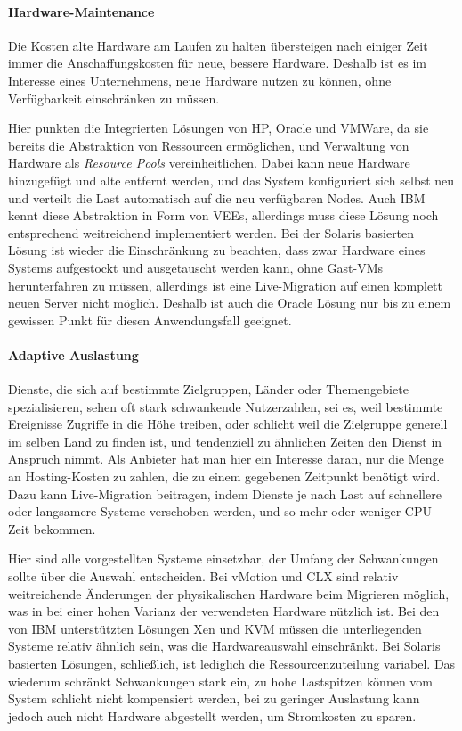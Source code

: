 \paragraph*{Hardware-Maintenance}
Die Kosten alte Hardware am Laufen zu halten übersteigen nach einiger
Zeit immer die Anschaffungskosten für neue, bessere Hardware. Deshalb
ist es im Interesse eines Unternehmens, neue Hardware nutzen zu
können, ohne Verfügbarkeit einschränken zu müssen.

Hier punkten die Integrierten Lösungen von HP, Oracle und VMWare, da
sie bereits die Abstraktion von Ressourcen ermöglichen, und Verwaltung
von Hardware als \emph{Resource Pools} vereinheitlichen. Dabei kann
neue Hardware hinzugefügt und alte entfernt werden, und das System
konfiguriert sich selbst neu und verteilt die Last automatisch auf die
neu verfügbaren Nodes. Auch IBM kennt diese Abstraktion in Form von
\acp{VEE}, allerdings muss diese Lösung noch entsprechend weitreichend
implementiert werden.  Bei der Solaris basierten Lösung ist wieder die
Einschränkung zu beachten, dass zwar Hardware eines Systems
aufgestockt und ausgetauscht werden kann, ohne Gast-VMs herunterfahren
zu müssen, allerdings ist eine Live-Migration auf einen komplett neuen
Server nicht möglich. Deshalb ist auch die Oracle Lösung nur bis zu
einem gewissen Punkt für diesen Anwendungsfall geeignet.

\paragraph*{Adaptive Auslastung}
Dienste, die sich auf bestimmte Zielgruppen, Länder oder Themengebiete
spezialisieren, sehen oft stark schwankende Nutzerzahlen, sei es, weil
bestimmte Ereignisse Zugriffe in die Höhe treiben, oder schlicht weil
die Zielgruppe generell im selben Land zu finden ist, und tendenziell
zu ähnlichen Zeiten den Dienst in Anspruch nimmt. Als Anbieter hat man
hier ein Interesse daran, nur die Menge an Hosting-Kosten zu zahlen,
die zu einem gegebenen Zeitpunkt benötigt wird. Dazu kann
Live-Migration beitragen, indem Dienste je nach Last auf schnellere
oder langsamere Systeme verschoben werden, und so mehr oder weniger
CPU Zeit bekommen.

Hier sind alle vorgestellten Systeme einsetzbar, der Umfang der
Schwankungen sollte über die Auswahl entscheiden. Bei vMotion und
\ac{CLX} sind relativ weitreichende Änderungen der physikalischen
Hardware beim Migrieren möglich, was in bei einer hohen Varianz der
verwendeten Hardware nützlich ist. Bei den von IBM unterstützten
Lösungen Xen und \ac{KVM} müssen die unterliegenden Systeme relativ
ähnlich sein, was die Hardwareauswahl einschränkt. Bei Solaris
basierten Lösungen, schließlich, ist lediglich die Ressourcenzuteilung
variabel. Das wiederum schränkt Schwankungen stark ein, zu hohe
Lastspitzen können vom System schlicht nicht kompensiert werden, bei
zu geringer Auslastung kann jedoch auch nicht Hardware abgestellt
werden, um Stromkosten zu sparen.

